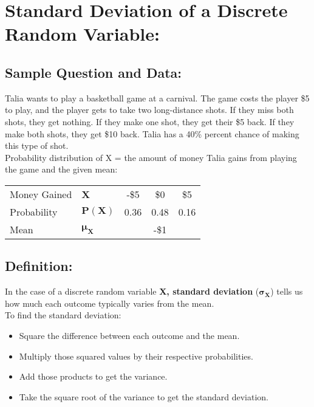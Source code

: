 \documentclass[12pt]{article}
\begin{document}
\section*{Standard Deviation of a Discrete Random Variable:}

\subsection*{Sample Question and Data:}
Talia wants to play a basketball game at a carnival. The game costs the player \$5 to play, and the player gets to take two long-distance shots. If they miss both shots, they get nothing. If they make one shot, they get their \$5 back. If they make both shots, they get \$10 back. Talia has a 40\% percent chance of making this type of shot. \\

Probability distribution of X = the amount of money Talia gains from playing the game and the given mean: \\

\begin{table}[h!]
\begin{center}
  \begin{tabular}{l l c c c}
    \toprule
    Money Gained & \textbf{X} & -\$5 & \$0 & \$5 \\
    Probability & $\bm{P (X)}$ & 0.36 & 0.48 & 0.16 \\
    \midrule
    Mean & $\bm{\mu_X}$ & & -\$1 & \\
    \bottomrule
  \end{tabular}
\end{center}
\end{table}


\subsection*{Definition:}
In the case of a discrete random variable \textbf{X, standard deviation} ($\bm{\sigma_X}$) tells us how much each outcome typically varies from the mean. \\

To find the standard deviation:

\begin{itemize}
  \item Square the difference between each outcome and the mean.
  \item Multiply those squared values by their respective probabilities.
  \item Add those products to get the variance.
  \item Take the square root of the variance to get the standard deviation.
\end{itemize}
\end{document}
